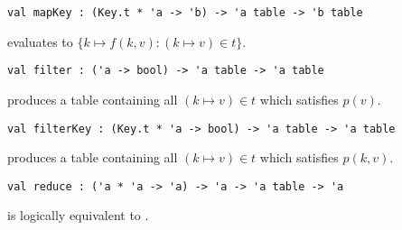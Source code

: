 \begin{cluster}
\label{grp:grm:ordtable-interface::mapkey}

\begin{gram}[mapKey]
\label{grm:ordtable-interface::mapkey}
\begin{verbatim}
val mapKey : (Key.t * 'a -> 'b) -> 'a table -> 'b table
\end{verbatim}
 evaluates to $\{k \mapsto f(k, v) : (k \mapsto v) \in t\}$.

\end{gram}
\end{cluster}

\begin{cluster}
\label{grp:grm:ordtable-interface::filter}

\begin{gram}[filter]
\label{grm:ordtable-interface::filter}
\begin{verbatim}
val filter : ('a -> bool) -> 'a table -> 'a table
\end{verbatim}
 produces a table containing all $(k \mapsto v) \in t$ which
satisfies $p(v)$.

\end{gram}
\end{cluster}

\begin{cluster}
\label{grp:grm:ordtable-interface::filterkey}

\begin{gram}[filterKey]
\label{grm:ordtable-interface::filterkey}
\begin{verbatim}
val filterKey : (Key.t * 'a -> bool) -> 'a table -> 'a table
\end{verbatim}
 produces a table containing all $(k \mapsto v) \in t$ which
satisfies $p(k,v)$.

\end{gram}
\end{cluster}

\begin{cluster}
\label{grp:grm:ordtable-interface::reduce}

\begin{gram}[reduce]
\label{grm:ordtable-interface::reduce}
\begin{verbatim}
val reduce : ('a * 'a -> 'a) -> 'a -> 'a table -> 'a
\end{verbatim}
 is logically equivalent to .

\end{gram}
\end{cluster}

